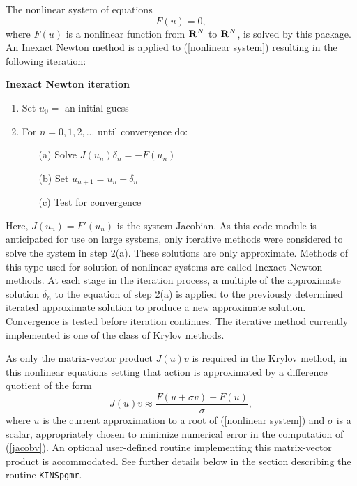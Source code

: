 The nonlinear system of equations
\begin{equation}
                  F(u) = 0, 
                             \label{nonlinear system}
\end{equation}
where $F(u)$ is a nonlinear function from ${\bf R}^N$ to ${\bf R}^N$, is 
solved by this package. An Inexact Newton method is applied to (\ref{nonlinear system}) 
resulting in the following iteration:

\newpage

{\bf Inexact Newton iteration}
\begin{enumerate}
   \item Set $u_0 = $ an initial guess
   \item For $n = 0, 1, 2,...$ until convergence do:\nonumber 
      \begin{itemize}
          \item[(a)] Solve $J(u_n)\delta_n = - F(u_n)$ 
	  \item[(b)] Set $u_{n+1} = u_n + \delta_n$
          \item[(c)] Test for convergence
      \end{itemize}
\end{enumerate}
Here, $J(u_n) = F'(u_n)$ is the system Jacobian. As this code module is
anticipated for use on large systems, only iterative methods were considered 
to solve the system in step 2(a). These solutions are only approximate. Methods
of this type used for solution of nonlinear systems are called Inexact Newton 
methods. At each stage in the iteration process, a multiple of the 
approximate solution $\delta_n$  to the equation of step 2(a) is applied 
to the previously determined iterated approximate solution to produce a new 
approximate solution. Convergence is tested before iteration continues. The 
iterative method currently implemented is one of the class of Krylov methods.

As only the matrix-vector product $J(u)v$ is required in the Krylov method, in
this nonlinear equations setting that action is approximated by a difference
quotient of the form
\begin{equation}
    J(u)v  \approx \frac {F(u+\sigma v) - F(u)}{\sigma},  \label{jacobv}
\end{equation}
where $u$ is the current approximation to a root of (\ref{nonlinear system}) 
and $\sigma$ is a scalar, appropriately chosen to minimize numerical error in 
the computation of (\ref{jacobv}). An optional user-defined routine 
implementing this matrix-vector product is accommodated. See further details 
below in the section describing the routine {\tt KINSpgmr}.

